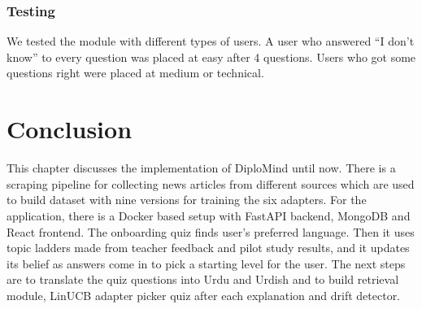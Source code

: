 \documentclass{FastFyp}
\begin{document}
\subsubsection{Testing}
We tested the module with different types of users. A user who answered ``I don't know'' to every question was placed at easy after 4 questions. Users who got some questions right were placed at medium or technical.


\section{Conclusion}
This chapter discusses the implementation of DiploMind until now. There is a scraping pipeline for collecting news articles from different sources which are used to build dataset with nine versions for training the six adapters. For the application, there is a Docker based setup with FastAPI backend, MongoDB and React frontend. The onboarding quiz finds user's preferred language. Then it uses topic ladders made from teacher feedback and pilot study results, and it updates its belief as answers come in to pick a starting level for the user. The next steps are to translate the quiz questions into Urdu and Urdish and to build retrieval module, LinUCB adapter picker quiz after each explanation and drift detector.

\end{document}
